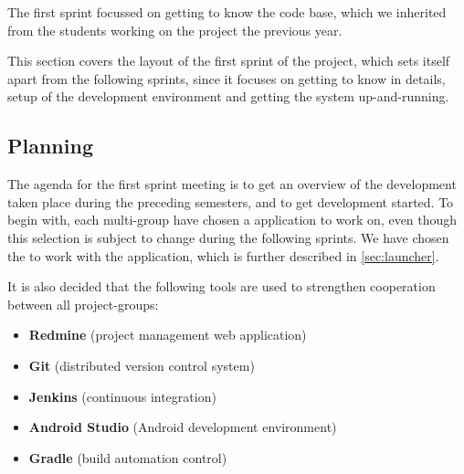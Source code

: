 The first sprint focussed on getting to know the \giraf code base, which we inherited from the students working on the project the previous year. 

This section covers the layout of the first sprint of the project, which sets itself apart from the following sprints, since it focuses on getting to know \giraf in details, setup of the development environment and getting the system up-and-running.

\subsection{Planning}\label{sec:sprint1:planning}
The agenda for the first sprint meeting is to get an overview of the development taken place during the preceding semesters, and to get development started.
To begin with, each multi-group have chosen a \giraf application to work on, even though this selection is subject to change during the following sprints.
We have chosen the to work with the \launcher application, which is further described in \cref{sec:launcher}.



It is also decided that the following tools are used to strengthen cooperation between all project-groups:

\begin{itemize}
\item \textbf{Redmine} (project management web application)
\item \textbf{Git} (distributed version control system)
\item \textbf{Jenkins} (continuous integration)
\item \textbf{Android Studio} (Android development environment)
\item \textbf{Gradle} (build automation control)
\end{itemize}

